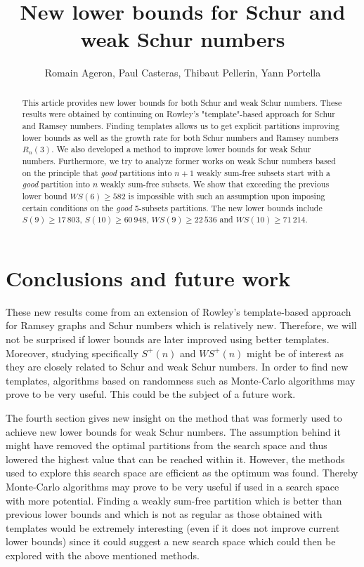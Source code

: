 \documentclass[3p]{elsarticle}
\title{New lower bounds for Schur and weak Schur numbers}
\author{Romain Ageron, Paul Casteras, Thibaut Pellerin, Yann Portella}
\newtheorem{computational theorem}[definition]{Computational Theorem}
\newcommand{\WS}{\mathit{WS}}
\begin{document}
\begin{abstract}

This article provides new lower bounds for both Schur and weak Schur numbers. These results were obtained by 
continuing on Rowley's "template"-based approach for Schur and Ramsey numbers. Finding templates allows us to 
get explicit partitions improving lower bounds as well as the growth rate for both Schur numbers and Ramsey 
numbers \(R_n(3)\). We also developed a method to improve lower bounds for weak Schur numbers. 
Furthermore, we try to analyze former works on weak Schur numbers based on the principle that \textit{good} 
partitions into \(n+1\) weakly sum-free subsets start with a \textit{good} partition into \(n\) weakly sum-free subsets. 
We show that exceeding the previous lower bound \(\WS (6) \geqslant 582\) is impossible with such an assumption 
upon imposing certain conditions on the \textit{good} 5-subsets partitions. The new lower bounds include 
\(S(9) \geqslant 17\,803\), \(S(10) \geqslant 60\,948\), \(\WS (9) \geqslant 22\,536\) and 
\(\WS (10) \geqslant 71\,214 \).

\end{abstract}

\maketitle







\section{Conclusions and future work}

\qquad These new results come from an extension of Rowley's template-based approach for Ramsey graphs and 
Schur numbers which is relatively new. Therefore, we will not be surprised if lower bounds are later improved 
using better templates. Moreover, studying specifically \(S^+(n)\) and \(\WS^+(n)\) might be of interest as they
 are closely related to Schur and weak Schur numbers. In order to find new templates, algorithms based on 
randomness such as Monte-Carlo algorithms may prove to be very useful. This could be the subject of a future work.

\par
The fourth section gives new insight on the method that was formerly used to achieve new lower bounds for weak 
Schur numbers. The assumption behind it might have removed the optimal partitions from the search space and thus 
lowered the highest value that can be reached within it. However, the methods used to explore this search space 
are efficient as the optimum was found. Thereby Monte-Carlo algorithms may prove to be very useful if used in a 
search space with more potential. Finding a weakly sum-free partition which is better than previous lower bounds 
and which is not as regular as those obtained with templates would be extremely interesting (even if it does not 
improve current lower bounds) since it could suggest a new search space which could then be explored with the 
above mentioned methods.
\end{document}
